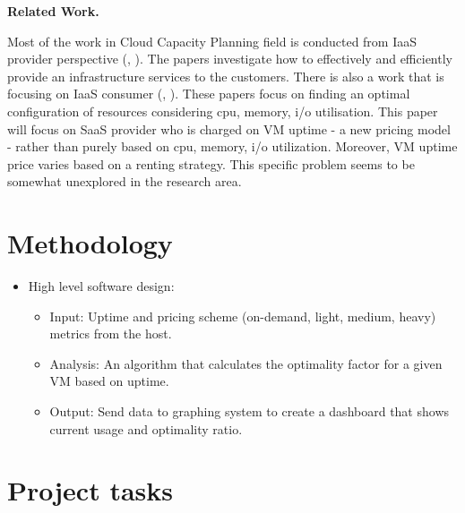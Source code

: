 \documentclass[11pt]{artikel3}
\begin{document}
{\bf Related Work.}

Most of the work in Cloud Capacity Planning field is conducted from IaaS provider perspective (\cite{bib:join_pricing}, \cite{bib:self_adaptive}). The papers investigate how to effectively and efficiently provide an infrastructure services to the customers.
There is also a work that is focusing on IaaS consumer (\cite{bib:cost-aware-elasticity}, \cite{bib:elastic-capacity-planning}). These papers focus on finding an optimal configuration of resources considering cpu, memory, i/o utilisation.
This paper will focus on SaaS provider who is charged on VM uptime - a new pricing model - rather than purely based on cpu, memory, i/o utilization. Moreover, VM uptime price varies based on a renting strategy. This specific problem seems to be somewhat unexplored in the research area.

\section{Methodology}

\begin{itemize}
\item High level software design:
\begin{itemize}
\item Input: Uptime and pricing scheme (on-demand, light, medium, heavy) metrics from the host.
\item Analysis: An algorithm that calculates the optimality factor for a given VM based on uptime.
\item Output: Send data to graphing system to create a dashboard that shows current usage and optimality ratio.
\end{itemize}
\end{itemize}

\section{Project tasks}
\end{document}
